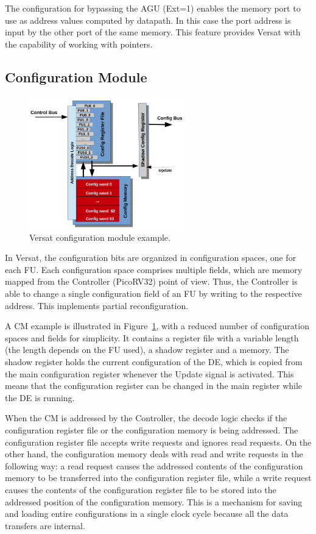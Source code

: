 The configuration for bypassing the \ac{AGU} (Ext=1) enables the memory port
to use as address values computed by datapath. In this case the port address is
input by the other port of the same memory. This feature provides Versat with
the capability of working with pointers.

\subsection{Configuration Module}
\label{subsection:configuration}

\begin{figure}[!htb]
	\centering
	\includegraphics[width=0.6\textwidth]{Figures/configuration.png}
	\caption{Versat configuration module example.}
	\label{fig:cm}
\end{figure}

In Versat, the configuration bits are organized in configuration spaces, one for
each \ac{FU}. Each configuration space comprises multiple fields, which are
memory mapped from the Controller (PicoRV32) point of view. Thus, the Controller
is able to change a single configuration field of an FU by writing to the
respective address. This implements partial reconfiguration.

A \ac{CM} example is illustrated in Figure~\ref{fig:cm}, with a reduced number
of configuration spaces and fields for simplicity. It contains a register file
with a variable length (the length depends on the \ac{FU} used), a shadow
register and a memory. The shadow register holds the current configuration of
the \ac{DE}, which is copied from the main configuration register whenever the
Update signal is activated. This means that the configuration register can be
changed in the main register while the \ac{DE} is running.

When the \ac{CM} is addressed by the Controller, the decode logic checks if the
configuration register file or the configuration memory is being addressed. The
configuration register file accepts write requests and ignores read requests. On
the other hand, the configuration memory deals with read and write requests in
the following way: a read request causes the addressed contents of the
configuration memory to be transferred into the configuration register file,
while a write request causes the contents of the configuration register file to
be stored into the addressed position of the configuration memory. This is a
mechanism for saving and loading entire configurations in a single clock cycle
because all the data transfers are internal.

